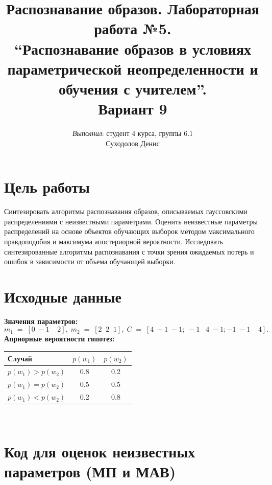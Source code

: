 \documentclass[10pt]{article} %
\begin{document}

\title{{\large Распознавание образов. Лабораторная работа №5.} \\
	\textbf{\textquotedblleft Распознавание образов в условиях параметрической неопределенности и обучения с учителем\textquotedblright}.\\
	{\large Вариант 9}
	}
\date{}
\author{\textit{Выполнил}: студент 4 курса, группы 6.1 \\
	Суходолов Денис}
        
\maketitle

\begin{spacing}{1} %
\section*{Цель работы}
Синтезировать алгоритмы распознавания  образов, описываемых
гауссовскими распределениями с неизвестными параметрами. Оценить
неизвестные параметры распределений на основе объектов обучающих
выборок методом максимального правдоподобия и максимума апостериорной
вероятности. Исследовать синтезированные алгоритмы распознавания с точки
зрения ожидаемых потерь и ошибок в зависимости от объема обучающей
выборки.
\section*{Исходные данные}
\textbf{Значения параметров:}
$$ m_1\;=\;[0\;-1\;\;\;\;2],\;m_2\;=\;[2\;\;2\;\;1],\;C\;=\;[4\;-1\;-1;\;-1\;\;\;4\;-1;-1\;-1\;\;\;\;4].$$
\textbf{Априорные вероятности гипотез:}
~\\
\begin{tabular}{| l | c | c |}
	\hline			
	Случай & $p(w_1)$ & $p(w_2)$ \\
	\hline	
	$p(w_1) > p(w_2)$ & 0.8 & 0.2 \\
	\hline	
	$p(w_1) = p(w_2)$ & 0.5 & 0.5 \\
	\hline  
	$p(w_1) < p(w_2)$ & 0.2 & 0.8 \\
	\hline  
\end{tabular}
~\\
\section*{Код для оценок неизвестных параметров (МП и МАВ)}
 

\end{spacing}
\end{document}
